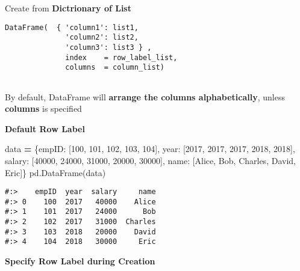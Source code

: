 \documentclass[
]{book}
\newenvironment{Shaded}{\begin{snugshade}}{\end{snugshade}}
\newcommand{\DecValTok}[1]{\textcolor[rgb]{0.06,0.06,0.06}{#1}}
\newcommand{\NormalTok}[1]{#1}
\newcommand{\OperatorTok}[1]{\textcolor[rgb]{0.43,0.43,0.43}{\textbf{#1}}}
\newcommand{\StringTok}[1]{\textcolor[rgb]{0.5,0.5,0.5}{#1}}
\begin{document}
Create from \textbf{Dictrionary of List}

\begin{verbatim}
DataFrame(  { 'column1': list1,
              'column2': list2,
              'column3': list3 } , 
              index    = row_label_list, 
              columns  = column_list)
              
\end{verbatim}

By default, DataFrame will \textbf{arrange the columns alphabetically}, unless \textbf{columns} is specified

\textbf{Default Row Label}

\begin{Shaded}
\begin{Highlighting}[]
\NormalTok{data }\OperatorTok{=}\NormalTok{ \{}\StringTok{\textquotesingle{}empID\textquotesingle{}}\NormalTok{:  [}\DecValTok{100}\NormalTok{,      }\DecValTok{101}\NormalTok{,    }\DecValTok{102}\NormalTok{,      }\DecValTok{103}\NormalTok{,     }\DecValTok{104}\NormalTok{],}
        \StringTok{\textquotesingle{}year\textquotesingle{}}\NormalTok{:   [}\DecValTok{2017}\NormalTok{,     }\DecValTok{2017}\NormalTok{,   }\DecValTok{2017}\NormalTok{,      }\DecValTok{2018}\NormalTok{,    }\DecValTok{2018}\NormalTok{],}
        \StringTok{\textquotesingle{}salary\textquotesingle{}}\NormalTok{: [}\DecValTok{40000}\NormalTok{,    }\DecValTok{24000}\NormalTok{,  }\DecValTok{31000}\NormalTok{,     }\DecValTok{20000}\NormalTok{,   }\DecValTok{30000}\NormalTok{],}
        \StringTok{\textquotesingle{}name\textquotesingle{}}\NormalTok{:   [}\StringTok{\textquotesingle{}Alice\textquotesingle{}}\NormalTok{, }\StringTok{\textquotesingle{}Bob\textquotesingle{}}\NormalTok{,  }\StringTok{\textquotesingle{}Charles\textquotesingle{}}\NormalTok{, }\StringTok{\textquotesingle{}David\textquotesingle{}}\NormalTok{, }\StringTok{\textquotesingle{}Eric\textquotesingle{}}\NormalTok{]\}}
\NormalTok{pd.DataFrame(data)}
\end{Highlighting}
\end{Shaded}

\begin{verbatim}
#:>    empID  year  salary     name
#:> 0    100  2017   40000    Alice
#:> 1    101  2017   24000      Bob
#:> 2    102  2017   31000  Charles
#:> 3    103  2018   20000    David
#:> 4    104  2018   30000     Eric
\end{verbatim}

\textbf{Specify Row Label during Creation}
\end{document}
